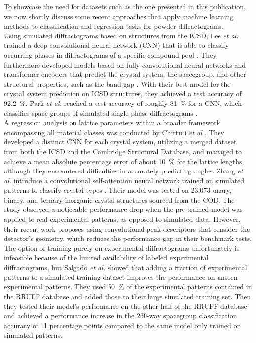 To showcase the need for datasets such as the one presented in this publication, we now shortly discuss some recent
approaches that apply machine learning methods to classification and regression tasks for powder diffractograms. \\

Using simulated diffractograms based on structures from the ICSD, Lee {\it et al.} trained a deep convolutional neural network (CNN) that is able to classify occurring phases in diffractograms of a specific compound pool \cite{Lee2020}. They furthermore developed models based on fully convolutional neural networks and transformer encoders that predict the crystal system, the spacegroup, and other structural properties, such as the band gap \cite{Lee2022}. With their best model for the crystal system prediction on ICSD structures, they achieved a test accuracy of \SI{92.2}{\percent}. Park {\it et al.} reached a test accuracy of roughly \SI{81}{\percent} for a CNN, which classifies space groups of simulated single-phase diffractograms \cite{Park2017}. \\

A regression analysis on lattice parameters within a broader framework encompassing all material classes was conducted by Chitturi {\it et al} \cite{Chitturi2021}. They developed a distinct CNN for each crystal system, utilizing a merged dataset from both the ICSD and the Cambridge Structural Database, and managed to achieve a mean absolute percentage error of about \SI{10}{\percent} for the lattice lengths, although they encountered difficulties in accurately predicting angles.
Zhang {\it et al.} introduce a convolutional self-attention neural network trained on simulated patterns to classify crystal types \cite{zhang2024crystallographic}. Their model was tested on 23,073 unary, binary, and ternary inorganic crystal structures sourced from the COD. The study observed a noticeable performance drop when the pre-trained model was applied to real experimental patterns, as opposed to simulated data. However, their recent work \cite{cao2024simxrd} proposes using convolutional peak descriptors that consider the detector's geometry, which reduces the performance gap in their benchmark tests.\\

The option of training purely on experimental diffractograms unfortunately is infeasible because of the limited availability of labeled experimental diffractograms, but Salgado {\it et al.} \cite{Salgado2023} showed that adding a fraction of experimental patterns to a simulated training dataset improves the performance on unseen experimental patterns. They used \SI{50}{\percent} of the experimental patterns contained in the RRUFF database and added those to their large simulated training set. Then they tested their model's performance on the other half of the RRUFF database and achieved a performance increase in the 230-way spacegroup classification accuracy of \num{11} percentage points compared to the same model only trained on simulated patterns. \\

